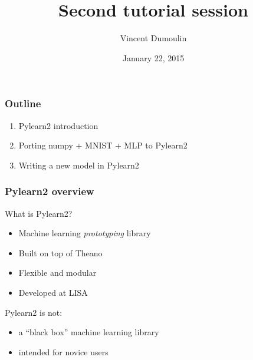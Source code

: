 \documentclass[mathserif, xcolor=dvipsnames]{beamer}
\title{Second tutorial session}
\author{Vincent Dumoulin}
\date{January 22, 2015}
\begin{document}
\begin{frame}[plain]
    \titlepage
\end{frame}

\begin{frame}
    \frametitle{Outline}
    \begin{enumerate}\addtolength{\itemsep}{1.5\baselineskip}
        \item{Pylearn2 introduction}
        \item{Porting numpy + MNIST + MLP to Pylearn2}
        \item{Writing a new model in Pylearn2}
    \end{enumerate}
\end{frame}

\begin{frame}
    \frametitle{Pylearn2 overview}

    \begin{block}{What is Pylearn2?}
    \begin{itemize}
        \item{Machine learning \emph{prototyping} library}
        \item{Built on top of Theano}
        \item{Flexible and modular}
        \item{Developed at LISA}
    \end{itemize}
    \end{block}

    \begin{alertblock}{Pylearn2 is not:}
    \begin{itemize}
        \item{a ``black box'' machine learning library}
        \item{intended for novice users}
    \end{itemize}
    \end{alertblock}
\end{frame}
\end{document}
